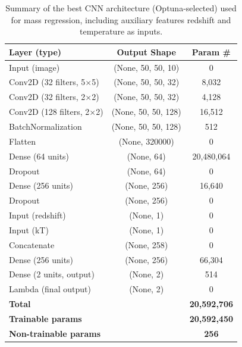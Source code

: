 \begin{table}[ht]
    \centering
    \caption{Summary of the best CNN architecture (Optuna-selected) used for mass regression, including auxiliary features redshift and temperature as inputs.}
    \label{tab:optuna-best-model}
    \begin{tabular}{|l|c|c|}
        \hline
        \textbf{Layer (type)} & \textbf{Output Shape} & \textbf{Param \#} \\
        \hline
        Input (image)                 & (None, 50, 50, 10)     & 0           \\
        Conv2D (32 filters, 5$\times$5)  & (None, 50, 50, 32)     & 8,032       \\
        Conv2D (32 filters, 2$\times$2)  & (None, 50, 50, 32)     & 4,128       \\
        Conv2D (128 filters, 2$\times$2) & (None, 50, 50, 128)    & 16,512      \\
        BatchNormalization              & (None, 50, 50, 128)    & 512         \\
        Flatten                         & (None, 320000)         & 0           \\
        Dense (64 units)                & (None, 64)             & 20,480,064  \\
        Dropout                         & (None, 64)             & 0           \\
        Dense (256 units)               & (None, 256)            & 16,640      \\
        Dropout                         & (None, 256)            & 0           \\
        Input (redshift)                & (None, 1)              & 0           \\
        Input (kT)                      & (None, 1)              & 0           \\
        Concatenate                     & (None, 258)            & 0           \\
        Dense (256 units)               & (None, 256)            & 66,304      \\
        Dense (2 units, output)         & (None, 2)              & 514         \\
        Lambda (final output)           & (None, 2)              & 0           \\
        \hline
        \textbf{Total}                  &                        & \textbf{20,592,706} \\
        \textbf{Trainable params}       &                        & \textbf{20,592,450} \\
        \textbf{Non-trainable params}   &                        & \textbf{256} \\
        \hline
    \end{tabular}
\end{table}


